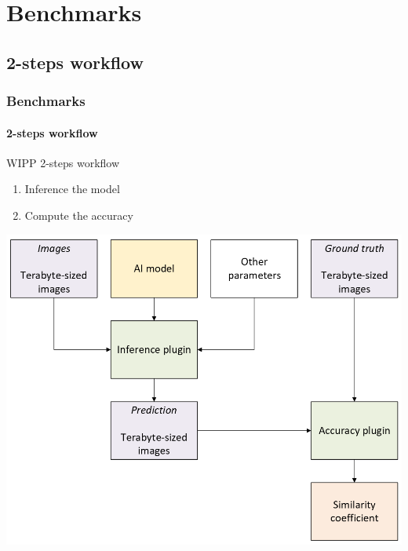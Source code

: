\def\sectiontitle{Benchmarks}

\section{\sectiontitle}

\def\slidetitle{2-steps workflow}

\subsection{\slidetitle}
\begin{frame}
  \frametitle{\sectiontitle}
  \framesubtitle{\slidetitle}

  \begin{minipage}[h!]{0.35\textwidth}

    WIPP 2-steps workflow

    \begin{enumerate}
        \item Inference the model
        \item Compute the accuracy
    \end{enumerate}

  \end{minipage}\hfill
  \begin{minipage}[h!]{0.65\textwidth}
    \includegraphics[scale=0.52]{./img/3_benchmark/workflow.png}
  \end{minipage}
\end{frame}

